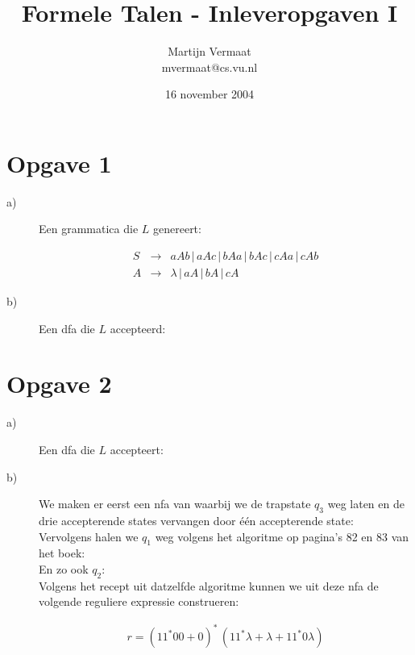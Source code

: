 \documentclass[a4paper,11pt]{article}
\title{Formele Talen - Inleveropgaven I}
\author{
    Martijn Vermaat\\
    mvermaat@cs.vu.nl
}
\date{16 november 2004}
\begin{document}
\maketitle


\section*{Opgave 1}


\begin{description}


\item[a)]

Een grammatica die $L$ genereert:

\begin{eqnarray*}
S & \rightarrow & aAb \, | \, aAc \, | \, bAa \, | \, bAc \, | \, cAa \, | \, cAb \nonumber \\
A & \rightarrow & \lambda \, | \, aA \, | \, bA \, | \, cA \nonumber
\end{eqnarray*}

\item[b)]

Een dfa die $L$ accepteerd:\\[1em]




\end{description}


\section*{Opgave 2}


\begin{description}


\item[a)]

Een dfa die $L$ accepteert:\\[1em]



\item[b)]

We maken er eerst een nfa van waarbij we de trapstate $q_{3}$ weg laten en
de drie accepterende states vervangen door \'e\'en accepterende state:\\[1em]



Vervolgens halen we $q_{1}$ weg volgens het algoritme op pagina's 82 en 83
van het boek:\\[1em]



En zo ook $q_{2}$:\\[1em]



Volgens het recept uit datzelfde algoritme kunnen we uit deze nfa de
volgende reguliere expressie construeren:

\begin{eqnarray*}
r = (11^{*}00 + 0)^{*} \, (11^{*}\lambda + \lambda + 11^{*}0\lambda)
\end{eqnarray*}


\end{description}
\end{document}
